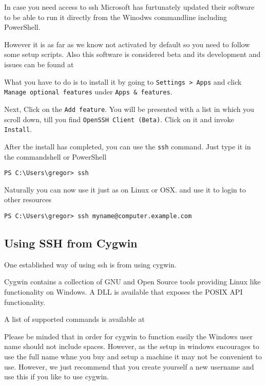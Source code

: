 
In case you need access to ssh Microsoft has furtunately updated their
software to be able to run it directly from the Winodws commandline
including PowerShell.

However it is as far as we know not activated by default so you need
to follow some setup scripts. Also this software is considered beta
and its development and issues can be found at


What you have to do is to install it by going to \verb|Settings > Apps|
and click \verb|Manage optional features| under \verb|Apps & features|.

Next, Click on the \verb|Add feature|. You will be presented with a
list in which you scroll down, till you find
\verb|OpenSSH Client (Beta)|. Click on it and invoke \verb|Install|.

After the install has completed, you can use the \verb|ssh| command.
Just type it in the commandshell or PowerShell 

\begin{verbatim}
PS C:\Users\gregor> ssh
\end{verbatim} 

Naturally you can now use it just as on Linux or OSX. and use it to
login to other resources 

\begin{verbatim}
PS C:\Users\gregor> ssh myname@computer.example.com
\end{verbatim} 


\subsection{Using SSH from Cygwin}

One established way of using ssh is from using cygwin.


Cygwin contains a collection of GNU and Open Source tools providing
Linux like functionality on Windows.  A DLL is available that
exposes the POSIX API functionality.

A list of supported commands is available at 


Please be minded that in order for cygwin to function easily the
Windows user name should not include spaces. However, as the setup in
windows encourages to use the full name whne you buy and setup a
machine it may not be convenient to use. However, we just recommend
that you create yourself a new username and use this if you like to
use cygwin.

